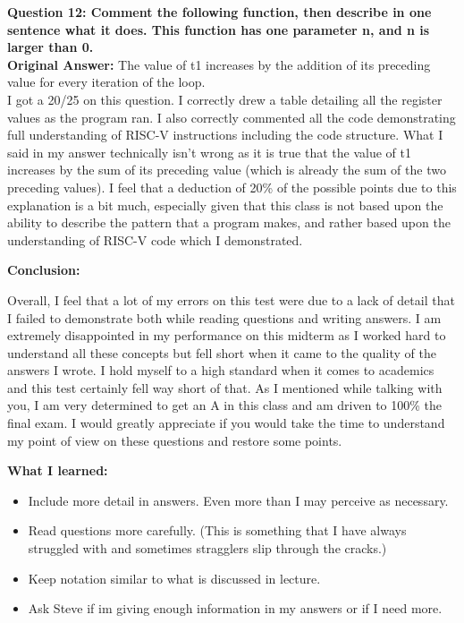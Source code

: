 \documentclass[12pt]{article}
\begin{document}
	\textbf{Question 12: Comment the following function, then describe in one sentence what it does. This function has one parameter n, and n is larger than 0.}  \\
		
	
	\textbf{Original Answer:} The value of t1 increases by the addition of its preceding value for every iteration of the loop.  \\
	
	I got a 20/25 on this question. I correctly drew a table detailing all the register values as the program ran. I also correctly commented all the code demonstrating full understanding of RISC-V instructions including the code structure. What I said in my answer technically isn't wrong as it is true that the value of t1 increases by the sum of its preceding value (which is already the sum of the two preceding values). I feel that a deduction of 20\% of the possible points due to this explanation is a bit much, especially given that this class is not based upon the ability to describe the pattern that a program makes, and rather based upon the understanding of RISC-V code which I demonstrated. \vspace{1cm} \\
	
	\begin{center}
		\textbf{Conclusion:} \\
	\end{center}
	
	Overall, I feel that a lot of my errors on this test were due to a lack of detail that I failed to demonstrate both while reading questions and writing answers. I am extremely disappointed in my performance on this midterm as I worked hard to understand all these concepts but fell short when it came to the quality of the answers I wrote. I hold myself to a high standard when it comes to academics and this test certainly fell way short of that. As I mentioned while talking with you, I am very determined to get an A in this class and am driven to 100\% the final exam. I would greatly appreciate if you would take the time to understand my point of view on these questions and restore some points.  \vspace{0.75cm} \\
	
	\begin{center}
	\textbf{What I learned:} \\
	\end{center}
	\begin{itemize}
		\item Include more detail in answers. Even more than I may perceive as necessary.
		\item Read questions more carefully. (This is something that I have always struggled with and sometimes stragglers slip through the cracks.)
		\item Keep notation similar to what is discussed in lecture.
		\item Ask Steve if im giving enough information in my answers or if I need more.
	\end{itemize}
	
	
	
	

	
\end{document}
